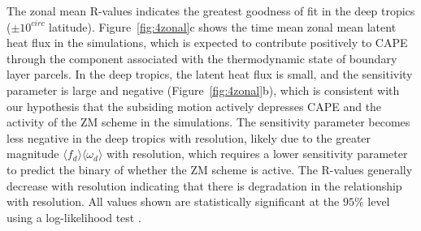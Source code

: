 \documentclass[times]{qjrms4}
\begin{document}
The zonal mean R-values indicates the greatest goodness of fit in the deep tropics ($\pm 10^{circ}$ latitude). Figure~\ref{fig:4zonal}c shows the time mean zonal mean latent heat flux in the simulations, which is expected to contribute positively to CAPE through the component associated with the thermodynamic state of boundary layer parcels. In the deep tropics, the latent heat flux is small, and the sensitivity parameter is large and negative (Figure~\ref{fig:4zonal}b), which is consistent with our hypothesis that the subsiding motion actively depresses CAPE and the activity of the ZM scheme in the simulations. The sensitivity parameter becomes less negative in the deep tropics with resolution, likely due to the greater magnitude $\langle f_{d} \rangle \langle \omega_{d} \rangle$ with resolution, which requires a lower sensitivity parameter to predict the binary of whether the ZM scheme is active. The R-values generally decrease with resolution indicating that there is degradation in the relationship with resolution. All values shown are statistically significant at the $95\%$ level using a log-likelihood test \citep{WILKSBOOK}.
\end{document}
